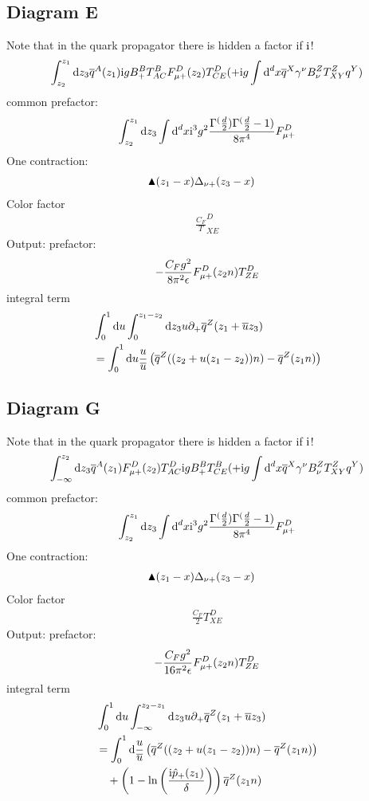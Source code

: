 \subsection{Diagram E}
Note that in the quark propagator there is hidden a factor if $\text{i}$!
\begin{align}
\int_{z_2}^{z_1} \text{d} z_3 \overline q^A(z_1) \text{i} g B_+^B T^B_{AC} F_{\mu +}^D(z_2) T^D_{CE} (+\text{i} g \int \text{d} ^d x \overline q^X \gamma^\nu B_\nu^Z T^Z_{XY} q^Y)
\end{align}
common prefactor:
\begin{align}
\int_{z_2}^{z_1} \text{d} z_3  \int \text{d} ^d x \text{i} ^3 g^2  \frac{\Gamma^(\frac{d}{2})\Gamma^(\frac{d}{2}-1)}{8\pi^4}F_{\mu +}^D
\end{align}
One contraction:
\begin{align}
&\blacktriangle(z_1 -x) \Delta_{\nu +}(z_3-x)
\end{align}
Color factor
\begin{align}
\frac{C_F} T^{D}_{XE}
\end{align}
Output:
prefactor:
\begin{align}
-\frac{ C_F g^2}{8 \pi^2 \epsilon}F_{\mu +}^D(z_2n) T^{D}_{ZE}
\end{align}
integral term
\begin{align}
&\int_0^1 \text{d} u \int_{0}^{z_1-z_2} \text{d} z_3 u \partial_+ \overline q^Z(z_1+\overline u z_3) 
\\
&=\int_0^1 \text{d} u \frac{u}{\overline u}\left(\overline q^Z((z_2+u(z_1-z_2))n)-\overline q^Z(z_1n)\right) 
\end{align}


\subsection{Diagram G}
Note that in the quark propagator there is hidden a factor if $\text{i}$!
\begin{align}
\int_{-\infty}^{z_2} \text{d} z_3 \overline q^A(z_1) F_{\mu +}^D(z_2) T^D_{AC} \text{i} g B_+^B T^B_{CE}  (+\text{i} g \int \text{d} ^d x \overline q^X \gamma^\nu B_\nu^Z T^Z_{XY} q^Y)
\end{align}
common prefactor:
\begin{align}
\int_{z_2}^{z_1} \text{d} z_3  \int \text{d} ^d x \text{i} ^3 g^2  \frac{\Gamma^(\frac{d}{2})\Gamma^(\frac{d}{2}-1)}{8\pi^4}F_{\mu +}^D
\end{align}
One contraction:
\begin{align}
&\blacktriangle(z_1 -x) \Delta_{\nu +}(z_3-x)
\end{align}
Color factor
\begin{align}
\frac{C_F}{2} T^{D}_{XE}
\end{align}
Output:
prefactor:
\begin{align}
-\frac{ C_F g^2}{16 \pi^2 \epsilon}F_{\mu +}^D(z_2n) T^{D}_{ZE}
\end{align}
integral term
\begin{align}
&\int_0^1 \text{d} u \int_{-\infty}^{z_2-z_1} \text{d} z_3 u \partial_+ \overline q^Z(z_1+\overline u z_3) 
\\
&=\int_0^1 \text{d} \frac{u}{\overline u} \left(\overline q^Z((z_2+u(z_1-z_2))n)-\overline q^Z(z_1n)\right)
\\&~~~
+\left(1-\ln\left(\frac{\text{i} \hat p_{+}(z_1)}{\delta}\right)\right)\overline q^Z(z_1n)
\end{align}

